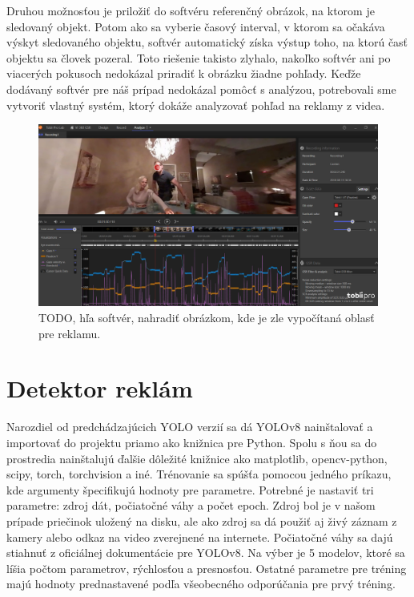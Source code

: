 Druhou možnosťou je priložiť do softvéru referenčný obrázok, na ktorom je sledovaný objekt. Potom ako sa vyberie časový interval, v ktorom sa očakáva výskyt sledovaného objektu, softvér automatický získa výstup toho, na ktorú časť objektu sa človek pozeral. Toto riešenie takisto zlyhalo, nakoľko softvér ani po viacerých pokusoch nedokázal priradiť k obrázku žiadne pohľady. Keďže dodávaný softvér pre náš prípad nedokázal pomôcť s analýzou, potrebovali sme vytvoriť vlastný systém, ktorý dokáže analyzovať pohľad na reklamy z videa.
\\
\begin{figure}[ht]
    \centering
    \includegraphics[width=1\textwidth]{images/02/tobiiprolab3.jpg}
    \caption{TODO, hľa softvér, nahradiť obrázkom, kde je zle vypočítaná oblasť pre reklamu.}
    \label{img:lab}
\end{figure}


\section{Detektor reklám}

Narozdiel od predchádzajúcich YOLO verzií sa dá YOLOv8 nainštalovať a importovať do projektu priamo ako knižnica pre Python. Spolu s ňou sa do prostredia nainštalujú ďalšie dôležité knižnice ako matplotlib, opencv-python, scipy, torch, torchvision a iné. Trénovanie sa spúšťa pomocou jedného príkazu, kde argumenty špecifikujú hodnoty pre parametre. Potrebné je nastaviť tri parametre: zdroj dát, počiatočné váhy a počet epoch. Zdroj bol je v našom prípade priečinok uložený na disku, ale ako zdroj sa dá použiť aj živý záznam z kamery alebo odkaz na video zverejnené na internete. Počiatočné váhy sa dajú stiahnuť z oficiálnej dokumentácie pre YOLOv8. Na výber je 5 modelov, ktoré sa líšia počtom parametrov, rýchlosťou a presnosťou. Ostatné parametre pre tréning majú hodnoty prednastavené podľa všeobecného odporúčania pre prvý tréning.


